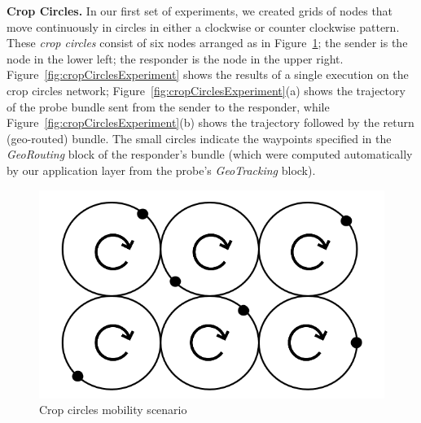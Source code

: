 {\bf Crop Circles.} In our first set of experiments, we created grids
of nodes that move continuously in circles in either a clockwise or
counter clockwise pattern. These {\em crop circles} consist of six
nodes arranged as in Figure~\ref{fig:cropcircle1}; the sender is the
node in the lower left; the responder is the node in the upper right.
Figure~\ref{fig:cropCirclesExperiment} shows the results of a single
execution on the crop circles network;
Figure~\ref{fig:cropCirclesExperiment}(a) shows the trajectory of the
probe bundle sent from the sender to the responder, while
Figure~\ref{fig:cropCirclesExperiment}(b) shows the trajectory
followed by the return (geo-routed) bundle. The small circles indicate
the waypoints specified in the {\em GeoRouting} block of the
responder's bundle (which were computed automatically by our
application layer from the probe's {\em GeoTracking} block).
\begin{figure}[!h]
\vspace{-.2cm}
\begin{center}
\includegraphics[width=.65\columnwidth]{figures/cropcircles2.png}
\end{center}
\vspace{-.75cm}
\caption{Crop circles mobility scenario}\label{fig:cropcircle1}
\vspace{-.25cm}
\end{figure}

